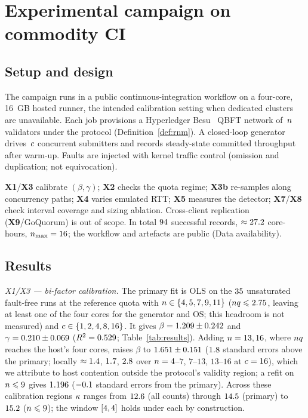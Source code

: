 \section{Experimental campaign on commodity CI}
\label{sec:exp}

\subsection{Setup and design}

The campaign runs in a public continuous-integration workflow on a four-core,
16~GB hosted runner, the intended calibration setting when dedicated clusters
are unavailable.
Each job provisions a Hyperledger Besu~\cite{besu} QBFT network of~$n$
validators under the \RNM{} protocol (Definition~\ref{def:rnm}). A closed-loop
generator drives~$c$ concurrent submitters and records steady-state committed
throughput after warm-up. Faults are injected with kernel traffic control
(omission and duplication; not equivocation).

\textbf{X1}/\textbf{X3} calibrate $(\beta,\gamma)$; \textbf{X2} checks the quota
regime; \textbf{X3b} re-samples along concurrency paths; \textbf{X4} varies
emulated RTT; \textbf{X5} measures the detector; \textbf{X7}/\textbf{X8} check
interval coverage and sizing ablation. Cross-client replication
(\textbf{X9}/GoQuorum) is out of scope. In total $94$ successful
records, $\approx27.2$ core-hours, $\n_{\max}=\resNmaxMeasured$; the
workflow and artefacts are public (Data availability).

\subsection{Results}

\emph{X1/X3 --- bi-factor calibration.}
The primary fit is OLS on the $35$ unsaturated fault-free runs at the
reference quota with $n\in\{4,5,7,9,11\}$ ($nq\leqslant2.75$, leaving at
least one of the four cores for the generator and OS; this headroom is not
measured) and $c\in\{1,2,4,8,16\}$. It gives
$\beta=1.209\pm0.242$ and $\gamma=0.210\pm0.069$
($R^{2}=0.529$; Table~\ref{tab:results}). Adding $n=13,16$, where $nq$
reaches the host's four cores, raises $\beta$ to $1.651\pm0.151$
($1.8$ standard errors above the primary; locally
$\approx1.4$, $1.7$, $2.8$ over $n=4$--$7$,
$7$--$13$, $13$--$16$ at $c=16$), which we attribute to host contention outside
the protocol's validity region; a refit on $n\leqslant9$ gives
$1.196$ ($-0.1$ standard errors from the primary). Across
these calibration regions $\kappa$ ranges from $12.6$ (all counts)
through $14.5$ (primary) to $15.2$ ($n\leqslant9$); the
window $[4,4]$ holds under each by construction.

